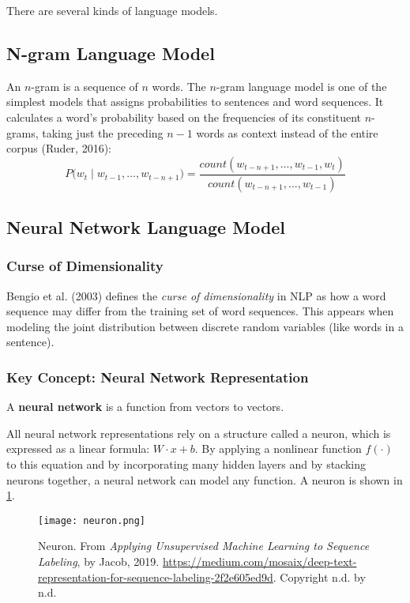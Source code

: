 There are several kinds of language models. 

\subsection{N-gram Language Model} \label{sec:NGramLM}

An $n$-gram is a sequence of $n$ words. The $n$-gram language model is one of the simplest models that assigns probabilities to sentences and word sequences. It calculates a word's probability based on the frequencies of its constituent $n$-grams, taking just the preceding $n-1$ words as context instead of the entire corpus (Ruder, 2016): 
$$
P \Big(w_t \; | \; w_{t-1}, ..., w_{t-n+1} \Big) = \frac {count(w_{t-n+1},...,w_{t-1},w_t)} {count(w_{t-n+1},...,w_{t-1})}
$$

\subsection{Neural Network Language Model} \label{sec:NeuralLM}

\subsubsection{Curse of Dimensionality} \label{sec:CurseDim}

Bengio et al. (2003) defines the \emph{curse of dimensionality} in NLP as how a word sequence may differ from the training set of word sequences. This appears when modeling the joint distribution between discrete random variables (like words in a sentence). 

\subsubsection{Key Concept: Neural Network Representation} \label{sec:NeuralNetRepr}

A \textbf{neural network} is a function from vectors to vectors.  

All neural network representations rely on a structure called a neuron, which is expressed as a linear formula: $W \cdot x + b$. By applying a nonlinear function $f(\cdot)$ to this equation and by incorporating many hidden layers and by stacking neurons together, a neural network can model any function. A neuron is shown in \cref{fig:neuron}.

\begin{figure}[h]
\vspace{-5pt}
\centering
\texttt{[image: neuron.png]}
\vspace{-5pt}
\caption{\footnotesize Neuron. From \emph{Applying Unsupervised Machine Learning to Sequence Labeling}, by Jacob, 2019. \url{https://medium.com/mosaix/deep-text-representation-for-sequence-labeling-2f2e605ed9d}. Copyright n.d. by n.d.}
\vspace{-5pt}
\label{fig:neuron}
\end{figure}

